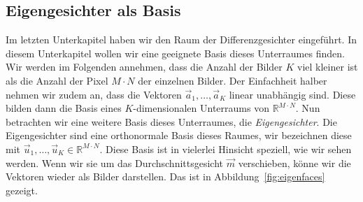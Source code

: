 \subsection{Eigengesichter als Basis}
Im letzten Unterkapitel haben wir den Raum der Differenzgesichter eingeführt.
In diesem Unterkapitel wollen wir eine geeignete Basis dieses Unterraumes finden.
Wir werden im Folgenden annehmen, dass die Anzahl der Bilder $K$ viel kleiner ist als die Anzahl der Pixel $M\cdot N$ der einzelnen Bilder.
Der Einfachheit halber nehmen wir zudem an, dass die Vektoren $\vec a_1,\ldots,\vec a_K$ linear unabhängig sind.
Diese bilden dann die Basis eines $K$-dimensionalen Unterraums von $\mathbb R^{M\cdot N}$.
Nun betrachten wir eine weitere Basis dieses Unterraumes, die \textit{Eigengesichter}.
Die Eigengesichter sind eine orthonormale Basis dieses Raumes, wir bezeichnen diese mit $\vec u_1,\dots,\vec u_K\in\mathbb R^{M\cdot N}$.
Diese Basis ist in vielerlei Hinsicht speziell, wie wir sehen werden.
Wenn wir sie um das Durchschnittsgesicht $\vec m$ verschieben, könne wir die Vektoren wieder als Bilder darstellen.
Das ist in Abbildung~\ref{fig:eigenfaces} gezeigt.
